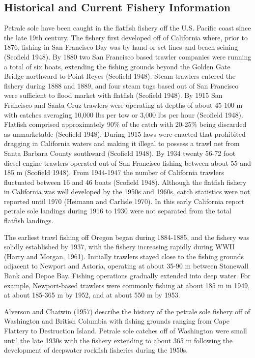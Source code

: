 \documentclass[12pt,]{article}
\begin{document}
\subsection{Historical and Current Fishery
Information}\label{historical-and-current-fishery-information}

Petrale sole have been caught in the flatfish fishery off the U.S.
Pacific coast since the late 19th century. The fishery first developed
off of California where, prior to 1876, fishing in San Francisco Bay was
by hand or set lines and beach seining (Scofield 1948). By 1880 two San
Francisco based trawler companies were running a total of six boats,
extending the fishing grounds beyond the Golden Gate Bridge northward to
Point Reyes (Scofield 1948). Steam trawlers entered the fishery during
1888 and 1889, and four steam tugs based out of San Francisco were
sufficient to flood market with flatfish (Scofield 1948). By 1915 San
Francisco and Santa Cruz trawlers were operating at depths of about
45-100 m with catches averaging 10,000 lbs per tow or 3,000 lbs per hour
(Scofield 1948). Flatfish comprised approximately 90\% of the catch with
20-25\% being discarded as unmarketable (Scofield 1948). During 1915
laws were enacted that prohibited dragging in California waters and
making it illegal to possess a trawl net from Santa Barbara County
southward (Scofield 1948). By 1934 twenty 56-72 foot diesel engine
trawlers operated out of San Francisco fishing between about 55 and 185
m (Scofield 1948). From 1944-1947 the number of California trawlers
fluctuated between 16 and 46 boats (Scofield 1948). Although the
flatfish fishery in California was well developed by the 1950s and
1960s, catch statistics were not reported until 1970 (Heimann and
Carlisle 1970). In this early California report petrale sole landings
during 1916 to 1930 were not separated from the total flatfish landings.

The earliest trawl fishing off Oregon began during 1884-1885, and the
fishery was solidly established by 1937, with the fishery increasing
rapidly during WWII (Harry and Morgan, 1961). Initially trawlers stayed
close to the fishing grounds adjacent to Newport and Astoria, operating
at about 35-90 m between Stonewall Bank and Depoe Bay. Fishing
operations gradually extended into deep water. For example,
Newport-based trawlers were commonly fishing at about 185 m in 1949, at
about 185-365 m by 1952, and at about 550 m by 1953.

Alverson and Chatwin (1957) describe the history of the petrale sole
fishery off of Washington and British Columbia with fishing grounds
ranging from Cape Flattery to Destruction Island. Petrale sole catches
off of Washington were small until the late 1930s with the fishery
extending to about 365 m following the development of deepwater rockfish
fisheries during the 1950s.
\end{document}
